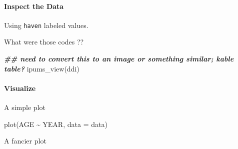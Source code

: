 \documentclass[
]{book}
\newenvironment{Shaded}{\begin{snugshade}}{\end{snugshade}}
\newcommand{\AttributeTok}[1]{\textcolor[rgb]{0.77,0.63,0.00}{#1}}
\newcommand{\DecValTok}[1]{\textcolor[rgb]{0.00,0.00,0.81}{#1}}
\newcommand{\DocumentationTok}[1]{\textcolor[rgb]{0.56,0.35,0.01}{\textbf{\textit{#1}}}}
\newcommand{\FunctionTok}[1]{\textcolor[rgb]{0.00,0.00,0.00}{#1}}
\newcommand{\NormalTok}[1]{#1}
\newcommand{\SpecialCharTok}[1]{\textcolor[rgb]{0.00,0.00,0.00}{#1}}
\begin{document}
\hypertarget{inspect-the-data-2}{%
\paragraph*{Inspect the Data}\label{inspect-the-data-2}}

Using \texttt{haven} labeled values.

\begin{Shaded}
\end{Shaded}

What were those codes ??

\begin{Shaded}
\begin{Highlighting}[]
\DocumentationTok{\#\# need to convert this to an image or something similar; kable table?}
\FunctionTok{ipums\_view}\NormalTok{(ddi)}
\end{Highlighting}
\end{Shaded}

\hypertarget{visualize}{%
\paragraph*{Visualize}\label{visualize}}

A simple plot

\begin{Shaded}
\begin{Highlighting}[]
\FunctionTok{plot}\NormalTok{(AGE }\SpecialCharTok{\textasciitilde{}}\NormalTok{ YEAR, }\AttributeTok{data =}\NormalTok{ data)}
\end{Highlighting}
\end{Shaded}

A fancier plot
\end{document}
